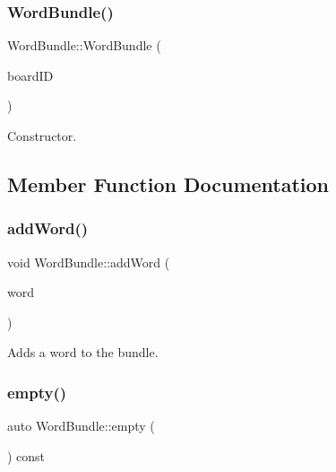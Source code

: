 \subsubsection{\texorpdfstring{Word\+Bundle()}{WordBundle()}}
{\footnotesize\ttfamily Word\+Bundle\+::\+Word\+Bundle (\begin{DoxyParamCaption}\item[{const \hyperlink{class_board_identifier}{Board\+Identifier}}]{board\+ID }\end{DoxyParamCaption})}



Constructor. 



\subsection{Member Function Documentation}
\mbox{\label{class_word_bundle_a167d2b6b4f504e4347191a8e5bb47e5e}} 
\subsubsection{\texorpdfstring{add\+Word()}{addWord()}}
{\footnotesize\ttfamily void Word\+Bundle\+::add\+Word (\begin{DoxyParamCaption}\item[{const unsigned int}]{word }\end{DoxyParamCaption})\hspace{0.3cm}{\ttfamily [inline]}}



Adds a word to the bundle. 

\mbox{\label{class_word_bundle_ab46858414d852c8d4079c4f611f4c96c}} 
\subsubsection{\texorpdfstring{empty()}{empty()}}
{\footnotesize\ttfamily auto Word\+Bundle\+::empty (\begin{DoxyParamCaption}{ }\end{DoxyParamCaption}) const\hspace{0.3cm}{\ttfamily [inline]}}



